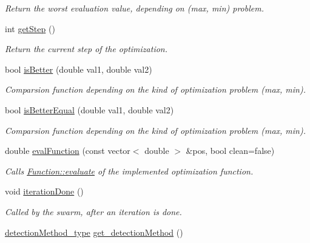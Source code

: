 \begin{CompactItemize}
\begin{CompactList}\small\item\em Return the worst evaluation value, depending on (max, min) problem. \item\end{CompactList}\item 
int \hyperlink{classPSO_134b1281d2b1216a2090217c21aff309}{getStep} ()
\begin{CompactList}\small\item\em Return the current step of the optimization. \item\end{CompactList}\item 
bool \hyperlink{classPSO_9a41fda12a9a5a81b97fc5183620f77b}{isBetter} (double val1, double val2)
\begin{CompactList}\small\item\em Comparsion function depending on the kind of optimization problem (max, min). \item\end{CompactList}\item 
bool \hyperlink{classPSO_d1599ea09344d65e4aaa533edafebd39}{isBetterEqual} (double val1, double val2)
\begin{CompactList}\small\item\em Comparsion function depending on the kind of optimization problem (max, min). \item\end{CompactList}\item 
double \hyperlink{classPSO_f4a2d70abe3be905c903502e806da3d3}{evalFunction} (const vector$<$ double $>$ \&pos, bool clean=false)
\begin{CompactList}\small\item\em Calls \hyperlink{classFunction_159260a1fc3afa8932491e4057b6b844}{Function::evaluate} of the implemented optimization function. \item\end{CompactList}\item 
void \hyperlink{classPSO_c35d78fd4c2c2b2d4f7b4e48f9a81578}{iterationDone} ()
\begin{CompactList}\small\item\em Called by the swarm, after an iteration is done. \item\end{CompactList}\item 
\hyperlink{pso_8h_ea087f59f65df7bbf4798bccd8a02416}{detectionMethod\_\-type} \hyperlink{classPSO_0d9b57fdc736b8e7be4aba0902a6f3a2}{get\_\-detectionMethod} ()

\end{CompactItemize}
